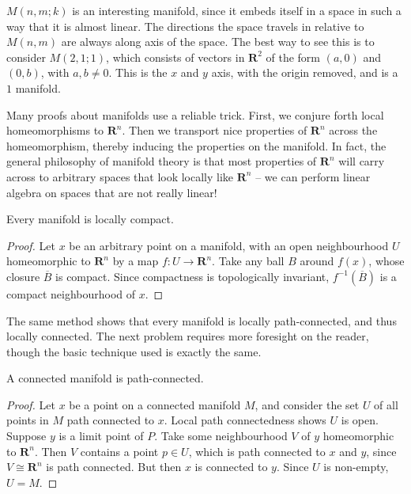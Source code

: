 $M(n,m;k)$ is an interesting manifold, since it embeds itself in a space in such a way that it is almost linear. The directions the space travels in relative to $M(n,m)$ are always along axis of the space. The best way to see this is to consider $M(2,1;1)$, which consists of vectors in $\mathbf{R}^2$ of the form $(a,0)$ and $(0,b)$, with $a,b \neq 0$. This is the $x$ and $y$ axis, with the origin removed, and is a $1$ manifold.

Many proofs about manifolds use a reliable trick. First, we conjure forth local homeomorphisms to $\mathbf{R}^n$. Then we transport nice properties of $\mathbf{R}^n$ across the homeomorphism, thereby inducing the properties on the manifold. In fact, the general philosophy of manifold theory is that most properties of $\mathbf{R}^n$ will carry across to arbitrary spaces that look locally like $\mathbf{R}^n$ -- we can perform linear algebra on spaces that are not really linear!

\begin{theorem}
    Every manifold is locally compact.
\end{theorem}
\begin{proof}
    Let $x$ be an arbitrary point on a manifold, with an open neighbourhood $U$ homeomorphic to $\mathbf{R}^n$ by a map $f:U \to \mathbf{R}^n$. Take any ball $B$ around $f(x)$, whose closure $\overline{B}$ is compact. Since compactness is topologically invariant, $f^{-1}(\overline{B})$ is a compact neighbourhood of $x$.
\end{proof}

The same method shows that every manifold is locally path-connected, and thus locally connected. The next problem requires more foresight on the reader, though the basic technique used is exactly the same.

\begin{theorem}
    A connected manifold is path-connected.
\end{theorem}
\begin{proof}
    Let $x$ be a point on a connected manifold $M$, and consider the set $U$ of all points in $M$ path connected to $x$. Local path connectedness shows $U$ is open. Suppose $y$ is a limit point of $P$. Take some neighbourhood $V$ of $y$ homeomorphic to $\mathbf{R}^n$. Then $V$ contains a point $p \in U$, which is path connected to $x$ and $y$, since $V \cong \mathbf{R}^n$ is path connected. But then $x$ is connected to $y$. Since $U$ is non-empty, $U = M$.
\end{proof}

